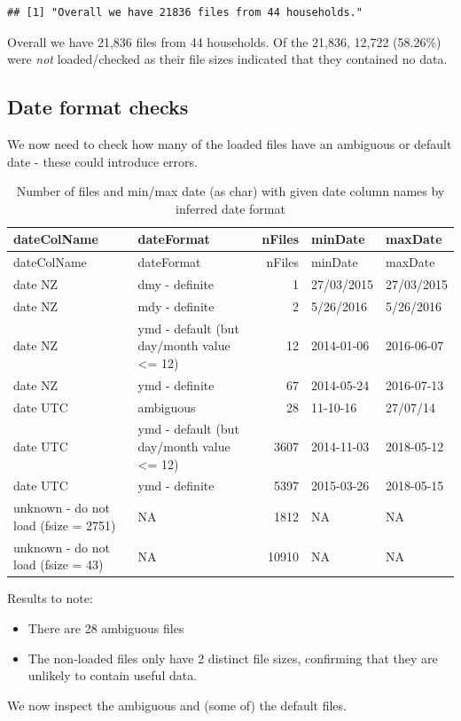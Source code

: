 \documentclass[]{article}
\providecommand{\tightlist}{%
  \setlength{\itemsep}{0pt}\setlength{\parskip}{0pt}}
\begin{document}
\begin{verbatim}
## [1] "Overall we have 21836 files from 44 households."
\end{verbatim}

Overall we have 21,836 files from 44 households. Of the 21,836, 12,722
(58.26\%) were \emph{not} loaded/checked as their file sizes indicated
that they contained no data.

\subsection{Date format checks}\label{date-format-checks}

We now need to check how many of the loaded files have an ambiguous or
default date - these could introduce errors.

\begin{longtable}[]{@{}llrll@{}}
\caption{Number of files and min/max date (as char) with given date
column names by inferred date format}\tabularnewline
\toprule
dateColName & dateFormat & nFiles & minDate & maxDate\tabularnewline
\midrule
\endfirsthead
\toprule
dateColName & dateFormat & nFiles & minDate & maxDate\tabularnewline
\midrule
\endhead
date NZ & dmy - definite & 1 & 27/03/2015 & 27/03/2015\tabularnewline
date NZ & mdy - definite & 2 & 5/26/2016 & 5/26/2016\tabularnewline
date NZ & ymd - default (but day/month value \textless{}= 12) & 12 &
2014-01-06 & 2016-06-07\tabularnewline
date NZ & ymd - definite & 67 & 2014-05-24 & 2016-07-13\tabularnewline
date UTC & ambiguous & 28 & 11-10-16 & 27/07/14\tabularnewline
date UTC & ymd - default (but day/month value \textless{}= 12) & 3607 &
2014-11-03 & 2018-05-12\tabularnewline
date UTC & ymd - definite & 5397 & 2015-03-26 &
2018-05-15\tabularnewline
unknown - do not load (fsize = 2751) & NA & 1812 & NA &
NA\tabularnewline
unknown - do not load (fsize = 43) & NA & 10910 & NA & NA\tabularnewline
\bottomrule
\end{longtable}

Results to note:

\begin{itemize}
\tightlist
\item
  There are 28 ambiguous files
\item
  The non-loaded files only have 2 distinct file sizes, confirming that
  they are unlikely to contain useful data.
\end{itemize}

We now inspect the ambiguous and (some of) the default files.
\end{document}
